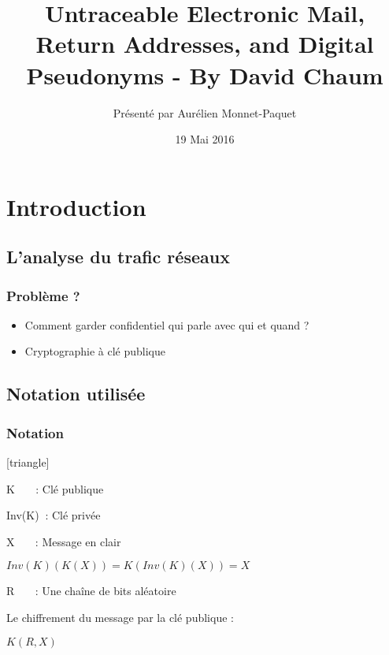 \documentclass{beamer}
\title{Untraceable Electronic Mail, Return Addresses, and Digital Pseudonyms - By David Chaum}
\author{Présenté par Aurélien Monnet-Paquet}
\institute{www.inria.fr}
\date{19 Mai 2016}
\begin{document}
\begin{frame}
\titlepage
\end{frame}

\section{Introduction}
\subsection{L'analyse du trafic réseaux}
\begin{frame}
\frametitle{Problème ?}
\begin{itemize}
[triangle]
\item Comment garder confidentiel qui parle avec qui et quand ?
\pause
\item Cryptographie à clé publique
\end{itemize}
\end{frame}

\subsection{Notation utilisée}
\begin{frame}
\frametitle{Notation}
\begin{itemize}
[triangle]
\item K $~~~~~~~$: Clé publique
\item Inv(K) $~$: Clé privée
\item X $~~~~~~~$: Message en clair
\pause
\item $Inv(K)( K( X ) ) = K( Inv(K)( X ) ) = X$
\pause
\item R $~~~~~~~$: Une chaîne de bits aléatoire
\pause
\item Le chiffrement du message par la clé publique :
\begin{center}
\item $K( R, X )$
\end{center}
\end{itemize}
\end{frame}

\end{document}
